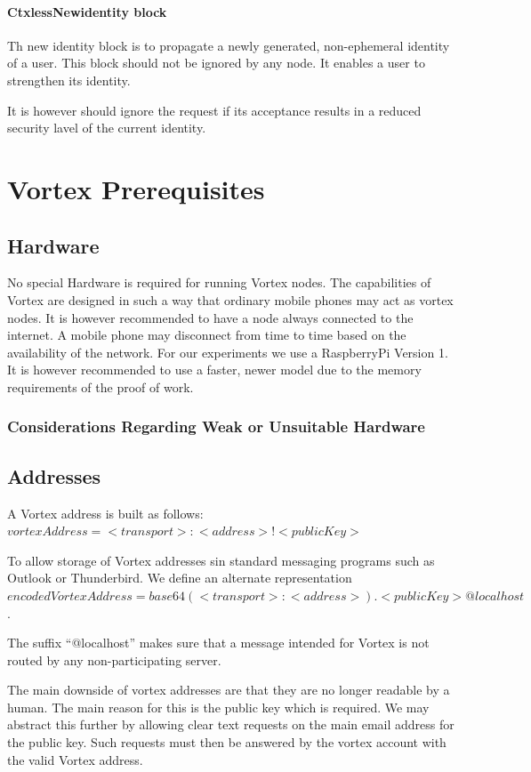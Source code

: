 \subsubsection{CtxlessNewidentity block}
Th new identity block is to propagate a newly generated, non-ephemeral identity of a user. This block should not be ignored by any node. It enables a user to strengthen its identity. 

It is however should ignore the request if its acceptance results in a reduced security lavel of the current identity.


\chapter{Vortex Prerequisites}
\section{Hardware}
No special Hardware is required for running Vortex nodes. The capabilities of Vortex are designed in such a way that ordinary mobile phones may act as vortex nodes. It is however recommended to have a node always connected to the internet. A mobile phone may disconnect from time to time based on the availability of the network. For our experiments we use a RaspberryPi Version 1. It is however recommended to use a faster, newer model due to the memory requirements of the proof of work.


\subsection{Considerations Regarding Weak or Unsuitable Hardware}

\section{Addresses}
A Vortex address is built as follows: $vortexAddress=<transport>:<address>!<publicKey>$

To allow storage of Vortex addresses sin standard messaging programs such as Outlook or Thunderbird. We define an alternate representation $encodedVortexAddress=base64(<transport>:<address>).<publicKey>@localhost$. 

The suffix ``@localhost'' makes sure that a message intended for Vortex is not routed by any non-participating server.

The main downside of vortex addresses are that they are no longer readable by a human. The main reason for this is the public key which is required. We may abstract this further by allowing clear text requests on the main email address for the public key. Such requests must then be answered by the vortex account with the valid Vortex address.

